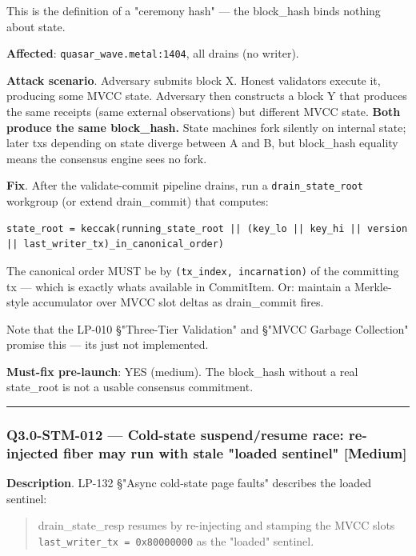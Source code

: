 \documentclass[
]{article}
\begin{document}
This is the definition of a "ceremony hash" --- the block\_hash binds
nothing about state.

\textbf{Affected}: \texttt{quasar\_wave.metal:1404}, all drains (no
writer).

\textbf{Attack scenario}. Adversary submits block X. Honest validators
execute it, producing some MVCC state. Adversary then constructs a block
Y that produces the same receipts (same external observations) but
different MVCC state. \textbf{Both produce the same block\_hash.} State
machines fork silently on internal state; later txs depending on state
diverge between A and B, but block\_hash equality means the consensus
engine sees no fork.

\textbf{Fix}. After the validate-commit pipeline drains, run a
\texttt{drain\_state\_root} workgroup (or extend drain\_commit) that
computes:

\begin{verbatim}
state_root = keccak(running_state_root || (key_lo || key_hi || version || last_writer_tx)_in_canonical_order)
\end{verbatim}

The canonical order MUST be by \texttt{(tx\_index,\ incarnation)} of the
committing tx --- which is exactly what\textquotesingle s available in
CommitItem. Or: maintain a Merkle-style accumulator over MVCC slot
deltas as drain\_commit fires.

Note that the LP-010 §"Three-Tier Validation" and §"MVCC Garbage
Collection" promise this --- it\textquotesingle s just not implemented.

\textbf{Must-fix pre-launch}: YES (medium). The block\_hash without a
real state\_root is not a usable consensus commitment.

\begin{center}\rule{0.5\linewidth}{0.5pt}\end{center}

\subsubsection{Q3.0-STM-012 --- Cold-state suspend/resume race:
re-injected fiber may run with stale "loaded sentinel"
{[}Medium{]}}\label{q30-stm-012--cold-state-suspendresume-race-re-injected-fiber-may-run-with-stale-loaded-sentinel-medium}

\textbf{Description}. LP-132 §"Async cold-state page faults" describes
the loaded sentinel:

\begin{quote}
drain\_state\_resp resumes by re-injecting and stamping the MVCC
slot\textquotesingle s
\texttt{last\_writer\_tx\ \textbar{}=\ 0x80000000} as the "loaded"
sentinel.
\end{quote}
\end{document}

